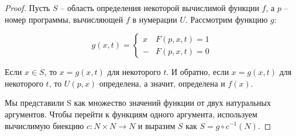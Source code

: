 \documentclass[a4paper,12pt]{article}
\begin{document}
    \begin{proof}
     Пусть $S$ -- область определения некоторой вычислимой функции $f$, а $p$ -- номер программы, вычисляющей $f$ в нумерации $U$. Рассмотрим функцию $g$:

     \begin{equation*}
      g(x, t) = 
      \begin{cases} 
         x & F(p, x, t) = 1\\
         -& F(p, x, t) = 0
      \end{cases}
     \end{equation*}

    Если $x \in S$, то $x = g(x, t)$ для некоторого $t$. И обратно, если $x = g(x, t)$ для
    некоторого $t$, то $U(p, x)$ определена, а значит, определена и $f(x)$.
    
    Мы представили S как множество значений функции от двух натуральных аргументов. Чтобы перейти к 
    функциям одного аргумента, используем вычислимую биекцию $c : N \times N \rightarrow N$ и выразим $S$ как $S = g \circ c^{-1}(N)$.
    \end{proof}
\end{document}

